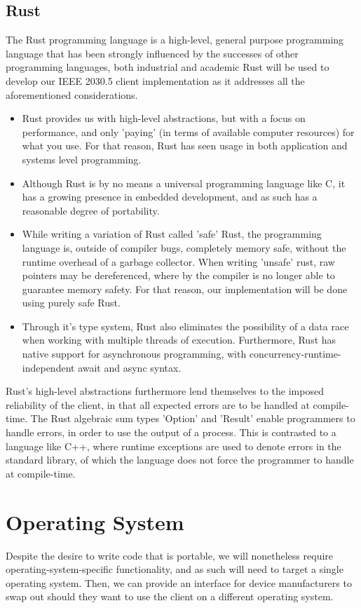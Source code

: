 \subsection{Rust}
The Rust programming language is a high-level, general purpose programming language that has been strongly influenced by the successes of other programming languages, both industrial and academic
Rust will be used to develop our IEEE 2030.5 client implementation as it addresses all the aforementioned considerations.

\begin{itemize}
    \item Rust provides us with high-level abstractions, but with a focus on performance, and only 'paying' (in terms of available computer resources) for what you use. For that reason, Rust has seen usage in both application and systems level programming.
    \item Although Rust is by no means a universal programming language like C, it has a growing presence in embedded development, and as such has a reasonable degree of portability.
    \item While writing a variation of Rust called 'safe' Rust, the programming language is, outside of compiler bugs, completely memory safe, without the runtime overhead of a garbage collector. When writing 'unsafe' rust, raw pointers may be dereferenced, where by the compiler is no longer able to guarantee memory safety. For that reason, our implementation will be done using purely safe Rust.
    \item Through it's type system, Rust also eliminates the possibility of a data race when working with multiple threads of execution. Furthermore, Rust has native support for asynchronous programming, with concurrency-runtime-independent await and async syntax.
\end{itemize}

Rust's high-level abstractions furthermore lend themselves to the imposed reliability of the client, in that all expected errors are to be handled at compile-time. The Rust algebraic sum types 'Option' and 'Result' enable programmers to handle errors, in order to use the output of a process.
This is contrasted to a language like C++, where runtime exceptions are used to denote errors in the standard library, of which the language does not force the programmer to handle at compile-time.

\section{Operating System}
Despite the desire to write code that is portable, we will nonetheless require operating-system-specific functionality, and as such will need to target a single operating system. Then, we can provide an interface for device manufacturers to swap out should they want to use the client on a different operating system.

